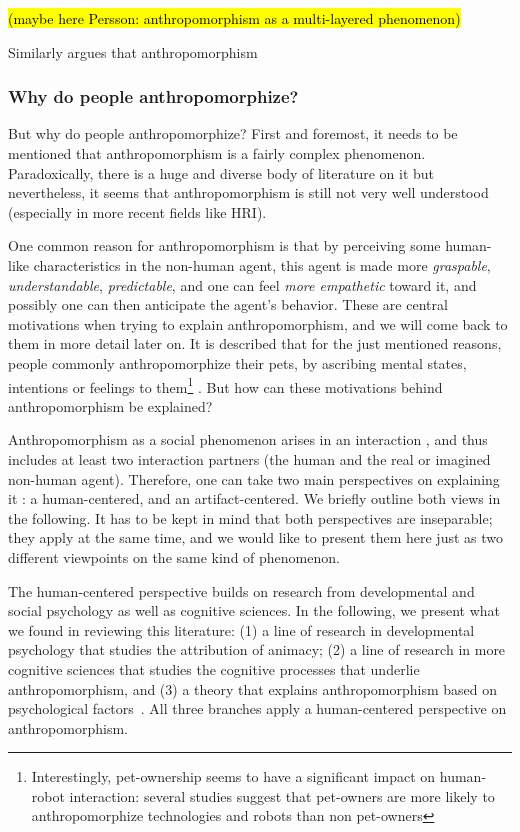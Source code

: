 \documentclass{frontiersSCNS} %
\begin{document}
\hl{(maybe here Persson: anthropomorphism as a multi-layered phenomenon)}

Similarly \cite{ruijten_introducing_2014} argues that anthropomorphism 

\subsubsection{Why do people anthropomorphize?\\}
\label{sec:explanations}

But why do people anthropomorphize? First and foremost, it needs to be mentioned that anthropomorphism is a fairly complex phenomenon. Paradoxically, there is a huge and diverse body of literature on it but nevertheless, it seems that anthropomorphism is still not very well understood (especially in more recent fields like HRI).

One common reason for anthropomorphism is that by perceiving some human-like characteristics in the non-human agent, this agent is made more \emph{graspable}, \emph{understandable}, \emph{predictable}, and one can feel \emph{more empathetic} toward it, and possibly one can then anticipate the agent's behavior. These are central motivations when trying to explain anthropomorphism, and we will come back to them in more detail later on. 
It is described that for the just mentioned reasons, people commonly anthropomorphize their pets, by ascribing mental states, intentions or feelings to them\footnote{Interestingly, pet-ownership seems to have a significant impact on human-robot interaction: several studies suggest that pet-owners are more likely to anthropomorphize technologies and robots than non pet-owners} \cite{eddy_attribution_1993}. But how can these motivations behind anthropomorphism be explained?

Anthropomorphism as a social phenomenon arises in an interaction \citep{persson_anthropomorphism_2000}, and thus includes at least two interaction partners (the human and the real or imagined non-human agent). Therefore, one can take two main perspectives on explaining it \citep{lee_human_2005}: a human-centered, and an artifact-centered. We briefly outline both views in the following. It has to be kept in mind that both perspectives are inseparable; they apply at the same time, and we would like to present them here just as two different viewpoints on the same kind of phenomenon.


The human-centered perspective builds on research from developmental and social psychology as well as cognitive sciences.  In the following, we present what we found in reviewing this literature: (1) a line of research in developmental psychology that studies the attribution of animacy; (2) a line of research in more cognitive sciences that studies the cognitive processes that underlie anthropomorphism, and (3) a theory that explains anthropomorphism based on psychological factors~\citep{epley_seeing_2007}. All three branches apply a human-centered perspective on anthropomorphism.
\end{document}

